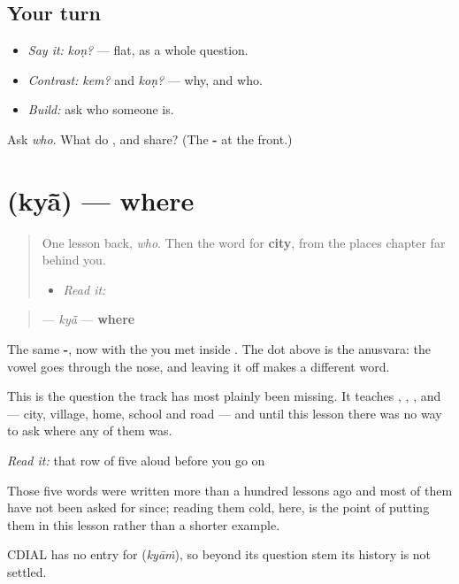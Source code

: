 \subsection*{Your turn}
\begin{itemize}
\raggedright
  \item \emph{Say it:} \emph{koṇ?} — flat, as a whole question.
  \item \emph{Contrast:} \emph{kem?} and \emph{koṇ?} — why, and who.
  \item \emph{Build:} ask who someone is.
\end{itemize}

\begin{tcolorbox}[breakable,colback=teal!4,colframe=teal!35!black,title={Before you move on}]
Ask \emph{who}. What do \textbf{}, \textbf{} and \textbf{} share? (The \textbf{-} at the front.)
\end{tcolorbox}
\section[\texorpdfstring{\gu{ક્યાં} (kyā̃)}{ક્યાં (kyā̃)}]{ (kyā̃) — where}

\label{lesson:GU-C37-kyaan}



\begin{quote}
One lesson back, \emph{who}. Then the word for \textbf{city}, from the places chapter far behind you.

\begin{itemize}
\raggedright
  \item \emph{Read it:} \textbf{}
\end{itemize}
\end{quote}

\begin{cousinweb}
\begin{quote}
\textbf{} — \emph{kyā̃} — \textbf{where}
\end{quote}

The same \textbf{-}, now with the \textbf{} you met inside \textbf{}. The dot above is the anusvara: the vowel goes through the nose, and leaving it off makes a different word.

This is the question the track has most plainly been missing. It teaches \textbf{}, \textbf{}, \textbf{}, \textbf{} and \textbf{} — city, village, home, school and road — and until this lesson there was no way to ask where any of them was.

\emph{Read it:} that row of five aloud before you go on

Those five words were written more than a hundred lessons ago and most of them have not been asked for since; reading them cold, here, is the point of putting them in this lesson rather than a shorter example.

CDIAL has no entry for \textbf{} (\emph{kyāṁ}), so beyond its question stem its history is not settled.
\end{cousinweb}

